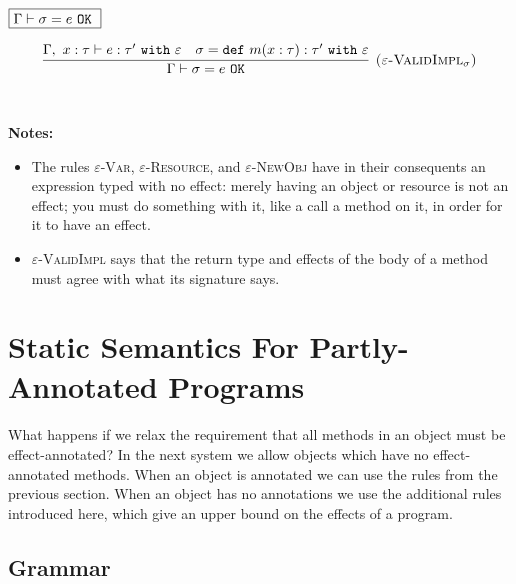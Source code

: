 \documentclass{llncs}
\newcommand{\keywadj}[1]{\mathtt{#1}}
\newcommand{\keyw}[1]{\keywadj{#1}~}
\begin{document}
$\fbox{$\Gamma \vdash \sigma = e~\keyw{OK}$}$

\[
\begin{array}{c}
\infer[\textsc{($\varepsilon$-ValidImpl$_\sigma$)}]
	{\Gamma \vdash \sigma = e~\keywadj{OK}}
	{\Gamma,~x:\tau \vdash e: \tau'~\keyw{with} \varepsilon & \sigma = \keyw{def} m(x:\tau):\tau'~\keyw{with} \varepsilon} \\[5ex]
\end{array}
\]

\noindent \textbf{Notes:}

\begin{itemize}
	\item The rules \textsc{$\varepsilon$-Var}, \textsc{$\varepsilon$-Resource}, and \textsc{$\varepsilon$-NewObj} have in their consequents an expression typed with no effect: merely having an object or resource is not an effect; you must do something with it, like a call a method on it, in order for it to have an effect.
	\item \textsc{$\varepsilon$-ValidImpl} says that the return type and effects of the body of a method must agree with what its signature says.
\end{itemize}




\newpage

\section{Static Semantics For Partly-Annotated Programs}

\paragraph{}
What happens if we relax the requirement that all methods in an object must be effect-annotated? In the next system we allow objects which have no effect-annotated methods. When an object is annotated we can use the rules from the previous section. When an object has no annotations we use the additional rules introduced here, which give an upper bound on the effects of a program.

\subsection{Grammar}
\end{document}
